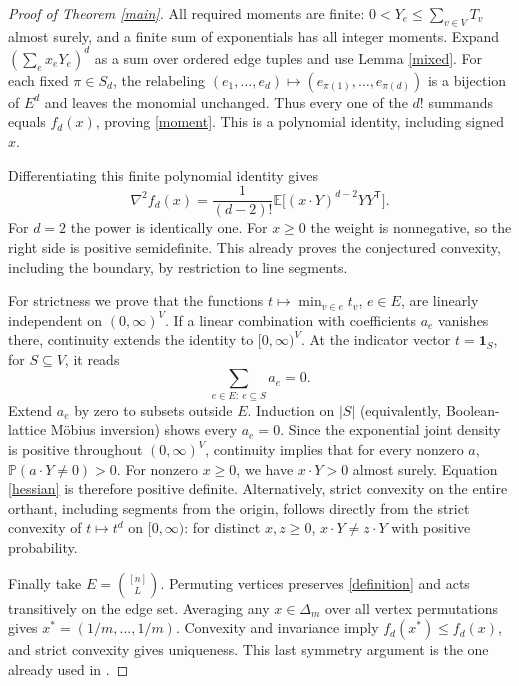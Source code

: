 \documentclass[11pt]{article}
\newcommand{\E}{\mathbb E}
\begin{document}
\begin{proof}[Proof of Theorem \ref{main}]
All required moments are finite: $0<Y_e\leq\sum_{v\in V}T_v$
almost surely, and a finite sum of exponentials has all integer
moments. Expand $(\sum_e x_eY_e)^d$ as a sum over ordered edge
tuples and use Lemma \ref{mixed}. For each fixed $\pi\in S_d$,
the relabeling $(e_1,\ldots,e_d)\mapsto(e_{\pi(1)},\ldots,e_{\pi(d)})$
is a bijection of $E^d$ and leaves the monomial unchanged.
Thus every one of the $d!$ summands equals $f_d(x)$, proving
\eqref{moment}. This is a polynomial identity, including signed $x$.

Differentiating this finite polynomial identity gives
\begin{equation}\label{hessian}
 \nabla^2 f_d(x)=\frac1{(d-2)!}
            \E\big[(x\mathbin{\cdot}Y)^{d-2}YY^{\mathsf T}\big].
\end{equation}
For $d=2$ the power is identically one. For $x\geq0$ the weight
is nonnegative, so the right side is positive semidefinite.
This already proves the conjectured convexity, including the
boundary, by restriction to line segments.

For strictness we prove that the functions
$t\mapsto\min_{v\in e}t_v$, $e\in E$, are linearly independent
on $(0,\infty)^V$. If a linear combination with coefficients $a_e$
vanishes there, continuity extends the identity to $[0,\infty)^V$.
At the indicator vector $t=\mathbf1_S$, for $S\subseteq V$, it reads
\[
                 \sum_{e\in E:\ e\subseteq S}a_e=0.
\]
Extend $a_e$ by zero to subsets outside $E$. Induction on $|S|$
(equivalently, Boolean-lattice M\"obius inversion) shows every
$a_e=0$. Since the exponential joint density is positive throughout
$(0,\infty)^V$, continuity implies that for every nonzero $a$,
$\mathbb P(a\mathbin{\cdot}Y\neq0)>0$.
For nonzero $x\geq0$, we have $x\mathbin{\cdot}Y>0$ almost surely.
Equation \eqref{hessian} is therefore positive definite.
Alternatively, strict convexity on the entire orthant, including
segments from the origin, follows directly from the strict convexity
of $t\mapsto t^d$ on $[0,\infty)$: for distinct $x,z\geq0$,
$x\mathbin{\cdot}Y\neq z\mathbin{\cdot}Y$ with positive probability.

Finally take $E=\binom{[n]}L$. Permuting vertices preserves
\eqref{definition} and acts transitively on the edge set.
Averaging any $x\in\Delta_m$ over all vertex permutations gives
$x^*=(1/m,\ldots,1/m)$. Convexity and invariance imply
$f_d(x^*)\leq f_d(x)$, and strict convexity gives uniqueness.
This last symmetry argument is the one already used in \cite{BLS}.
\end{proof}
\end{document}
